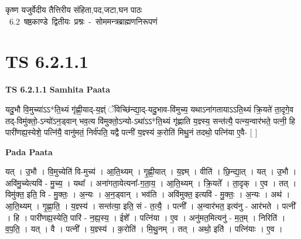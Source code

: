 \documentclass[17pt]{extarticle}
\begin{document}
\begin{titlepage}
    \begin{center}
 
\begin{sanskrit}
    { \Large
    कृष्ण यजुर्वेदीय तैत्तिरीय संहिता,पद,जटा,घन पाठः 
    }
    \\
    \vspace{2.5cm}
    \mbox{ \Large
    6.2       षष्ठकाण्डे द्वितीयः प्रश्नः - सोममन्त्रब्राह्मणनिरूपणं   }
\end{sanskrit}
\end{center}

\end{titlepage}
\tableofcontents
{}
\pagebreak


\section{ TS 6.2.1.1 }

\textbf{TS 6.2.1.1 } \newline
\textbf{Samhita Paata} \newline

यदु॒भौ वि॒मुच्या॑ऽऽ*ति॒थ्यं गृ॑ह्णी॒याद्-य॒ज्ञ्ं ॅविच्छि॑न्द्या॒द्-यदु॒भाव-वि॑मुच्य॒ यथाऽना॑गतायाऽऽति॒थ्यं क्रि॒यते॑ ता॒दृगे॒व तद्-विमु॑क्तो॒-ऽन्यो॑ऽन॒ड्वान् भव॒त्य वि॑मुक्तो॒ऽन्यो-ऽथा॑ऽऽ*ति॒थ्यं गृ॑ह्णाति य॒ज्ञ्स्य॒ सन्त॑त्यै॒ पत्न्य॒न्वार॑भते॒ पत्नी॒ हि पारी॑णह्य॒स्येशे॒ पत्नि॑यै॒ वानु॑मतं॒ निर्व॑पति॒ यद्वै पत्नी॑ य॒ज्ञ्स्य॑ क॒रोति॑ मिथु॒नं तदथो॒ पत्नि॑या ए॒वै- [  ] \newline

\textbf{Pada Paata} \newline

यत् । उ॒भौ । वि॒मुच्येति॑ वि-मुच्य॑ । आ॒ति॒थ्यम् । गृ॒ह्णी॒यात् । य॒ज्ञ्म् । वीति॑ । छि॒न्द्या॒त् । यत् । उ॒भौ । अवि॑मु॒च्येत्यवि॑ - मु॒च्य॒ । यथा᳚ । अना॑गता॒येत्यना᳚-ग॒ता॒य॒ । आ॒ति॒थ्यम् । क्रि॒यते᳚ । ता॒दृक् । ए॒व । तत् । विमु॑क्त॒ इति॒ वि - मु॒क्तः॒ । अ॒न्यः । अ॒न॒ड्वान् । भव॑ति । अवि॑मुक्त॒ इत्यवि॑ - मु॒क्तः॒ । अ॒न्यः । अथ॑ । आ॒ति॒थ्यम् । गृ॒ह्णा॒ति॒ । य॒ज्ञ्स्य॑ । सन्त॑त्या॒ इति॒ सं - त॒त्यै॒ । पत्नी᳚ । अ॒न्वार॑भत॒ इत्य॑नु - आर॑भते । पत्नी᳚ । हि । पारी॑णह्य॒स्येति॒ पारि॑ - न॒ह्य॒स्य॒ । ईशे᳚ । पत्नि॑या । ए॒व । अनु॑मत॒मित्यनु॑ - म॒त॒म् । निरिति॑ । व॒प॒ति॒ । यत् । वै । पत्नी᳚ । य॒ज्ञ्स्य॑ । क॒रोति॑ । मि॒थु॒नम् । तत् । अथो॒ इति॑ । पत्नि॑याः । ए॒व ।  \newline
\end{document}
